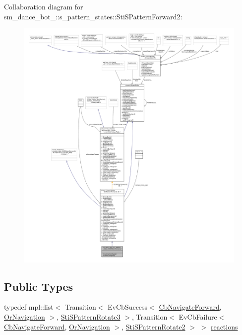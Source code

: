 Collaboration diagram for sm\+\_\+dance\+\_\+bot\+\_\+:\+:s\+\_\+pattern\+\_\+states\+:\+:Sti\+S\+Pattern\+Forward2\+:
\nopagebreak
\begin{figure}[H]
\begin{center}
\leavevmode
\includegraphics[width=350pt]{structsm__dance__bot__2_1_1s__pattern__states_1_1StiSPatternForward2__coll__graph}
\end{center}
\end{figure}
\subsection*{Public Types}
\begin{DoxyCompactItemize}
\item 
typedef mpl\+::list$<$ Transition$<$ Ev\+Cb\+Success$<$ \hyperlink{classcl__move__base__z_1_1CbNavigateForward}{Cb\+Navigate\+Forward}, \hyperlink{classsm__dance__bot__2_1_1OrNavigation}{Or\+Navigation} $>$, \hyperlink{structsm__dance__bot__2_1_1s__pattern__states_1_1StiSPatternRotate3}{Sti\+S\+Pattern\+Rotate3} $>$, Transition$<$ Ev\+Cb\+Failure$<$ \hyperlink{classcl__move__base__z_1_1CbNavigateForward}{Cb\+Navigate\+Forward}, \hyperlink{classsm__dance__bot__2_1_1OrNavigation}{Or\+Navigation} $>$, \hyperlink{structsm__dance__bot__2_1_1s__pattern__states_1_1StiSPatternRotate2}{Sti\+S\+Pattern\+Rotate2} $>$ $>$ \hyperlink{structsm__dance__bot__2_1_1s__pattern__states_1_1StiSPatternForward2_ae4c9543a69f845df49a6dc920b75a4a9}{reactions}
\end{DoxyCompactItemize}
